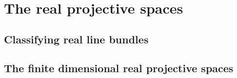 \section{The real projective spaces}

\subsection{Classifying real line bundles}

\subsection{The finite dimensional real projective spaces}
